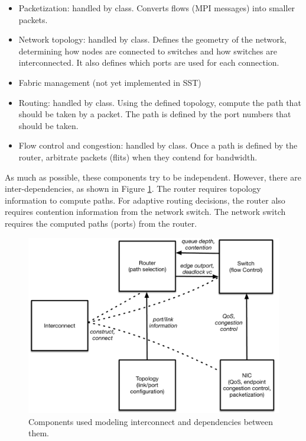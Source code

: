 \begin{itemize}
\item Packetization: handled by  class. Converts flows (MPI messages) into smaller packets.
\item Network topology: handled by  class. Defines the geometry of the network, determining how nodes are connected to switches and how switches are interconnected. It also defines which ports are used for each connection.
\item Fabric management (not yet implemented in SST)
\item Routing: handled by  class. Using the defined topology, compute the path that should be taken by a packet. The path is defined by the port numbers that should be taken.
\item Flow control and congestion: handled by  class. Once a path is defined by the router, arbitrate packets (flits) when they contend for bandwidth.
\end{itemize}
As much as possible, these components try to be independent. However, there are inter-dependencies, as shown in Figure \ref{fig:dependencies}.
The router requires topology information to compute paths. For adaptive routing decisions, the router also requires contention information from the network switch.
The network switch requires the computed paths (ports) from the router.

\begin{figure}
\centering
\includegraphics[width=1.0\textwidth]{figures/components}
\caption{Components used modeling interconnect and dependencies between them.}
\label{fig:dependencies}
\end{figure}

